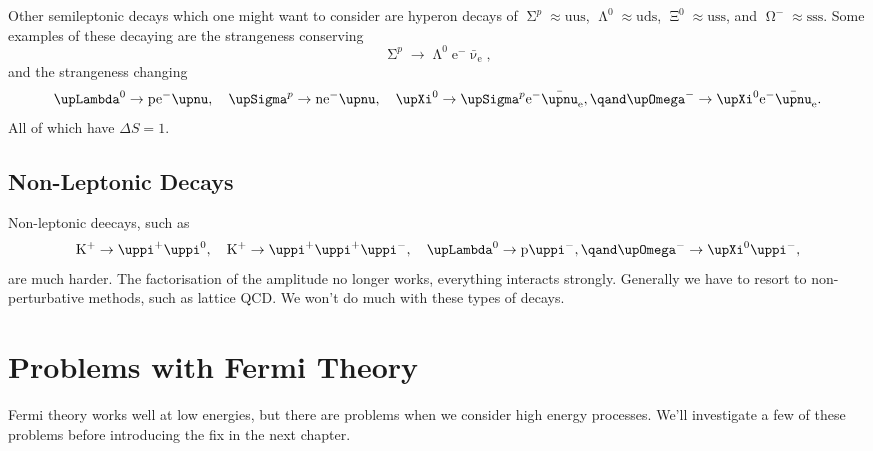\documentclass[fleqn]{NotesClass}
\newcommand{\Pparticle}[1]{\mathrm{#1}}
\newcommand{\Pu}{\ensuremath{\Pparticle{u}}}
\newcommand{\Pd}{\ensuremath{\Pparticle{d}}}
\newcommand{\Ps}{\ensuremath{\Pparticle{s}}}
\newcommand{\Pe}{\ensuremath{\Pparticle{e}^{-}}}
\newcommand{\Ppip}{\ensuremath{\uppi^{+}}}
\newcommand{\Ppim}{\ensuremath{\uppi^{-}}}
\newcommand{\Ppizero}{\ensuremath{\uppi^{0}}}
\newcommand{\PKp}{\ensuremath{\Pparticle{K}^+}}
\newcommand{\Pp}{\ensuremath{\Pparticle{p}}}
\newcommand{\Pn}{\ensuremath{\Pparticle{n}}}
\newcommand{\PSigmap}{\ensuremath{\upSigma^{p}}}
\newcommand{\PLambdazero}{\ensuremath{\upLambda^{0}}}
\newcommand{\PXizero}{\ensuremath{\upXi^{0}}}
\newcommand{\POmegam}{\ensuremath{\upOmega^{-}}}
\newcommand{\APantiparticle}[1]{\bar{#1}}
\newcommand{\APnu}{\ensuremath{\upnu}}
\newcommand{\APnue}{\ensuremath{\APantiparticle{\upnu}_{\mathrm{e}}}}
\begin{document}
    Other semileptonic decays which one might want to consider are hyperon decays of \(\PSigmap \approx \Pu\Pu\Ps\), \(\PLambdazero \approx \Pu\Pd\Ps\), \(\PXizero \approx \Pu\Ps\Ps\), and \(\POmegam \approx \Ps\Ps\Ps\).
    Some examples of these decaying are the strangeness conserving
    \begin{equation}
        \PSigmap \to \PLambdazero \Pe\APnue,
    \end{equation}
    and the strangeness changing
    \begin{equation}
        \PLambdazero \to \Pp\Pe\APnu, \quad \PSigmap \to \Pn\Pe\APnu, \quad \PXizero \to \PSigmap\Pe\APnue, \qand \POmegam \to \PXizero\Pe\APnue.
    \end{equation}
    All of which have \(\Delta S = 1\).
    
    \section{Non-Leptonic Decays}
    Non-leptonic deecays, such as
    \begin{equation}
        \PKp \to \Ppip\Ppizero, \quad \PKp \to \Ppip\Ppip\Ppim, \quad \PLambdazero \to \Pp\Ppim, \qand \POmegam \to \PXizero\Ppim,
    \end{equation}
    are much harder.
    The factorisation of the amplitude no longer works, everything interacts strongly.
    Generally we have to resort to non-perturbative methods, such as lattice QCD.
    We won't do much with these types of decays.
    
    \chapter{Problems with Fermi Theory}
    Fermi theory works well at low energies, but there are problems when we consider high energy processes.
    We'll investigate a few of these problems before introducing the fix in the next chapter.
    
\end{document}
